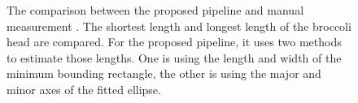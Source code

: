 \begin{figure}[htb!]
  \begin{center}
  \end{center}
  \caption[The comparison between the proposed  pipeline and manual measurement]{
    The comparison between the proposed  pipeline  and manual measurement . The shortest length and longest length of the broccoli head are compared. For the proposed pipeline, it uses two methods to estimate those lengths. One is using the length and width of the minimum bounding rectangle, the other is using the major and minor axes of the fitted ellipse.
  }
  \label{fig:des_compare}
\end{figure}